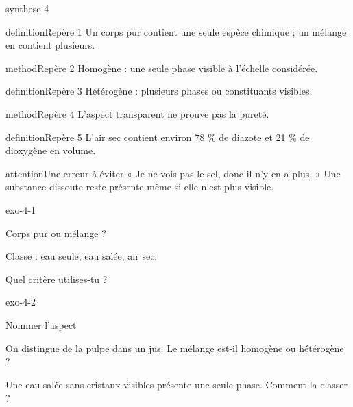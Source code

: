 \documentclass[12pt,twoside,openany]{book}
\begin{document}
\label{ch-4-bilan}
\begin{pcFiche}{synthese-4}
\begin{pcEncadre}{definition}{Repère 1}
Un corps pur contient une seule espèce chimique ; un mélange en contient plusieurs.\par
\end{pcEncadre}
\begin{pcEncadre}{method}{Repère 2}
Homogène : une seule phase visible à l’échelle considérée.\par
\end{pcEncadre}
\begin{pcEncadre}{definition}{Repère 3}
Hétérogène : plusieurs phases ou constituants visibles.\par
\end{pcEncadre}
\begin{pcEncadre}{method}{Repère 4}
L’aspect transparent ne prouve pas la pureté.\par
\end{pcEncadre}
\begin{pcEncadre}{definition}{Repère 5}
L’air sec contient environ 78 \% de diazote et 21 \% de dioxygène en volume.\par
\end{pcEncadre}
\begin{pcEncadre}{attention}{Une erreur à éviter}
« Je ne vois pas le sel, donc il n’y en a plus. » Une substance dissoute reste présente même si elle n’est plus visible.\par
\end{pcEncadre}
\end{pcFiche}
\clearpage{}
\begin{blocLivre}{exo-4-1}
\begin{exercice}[1]{Corps pur ou mélange ?}
\begin{questions}
\item Classe : eau seule, eau salée, air sec.
\item Quel critère utilises-tu ?
\end{questions}
\end{exercice}\end{blocLivre}
\begin{blocLivre}{exo-4-2}
\begin{exercice}[1]{Nommer l’aspect}
\begin{questions}
\item On distingue de la pulpe dans un jus. Le mélange est-il homogène ou hétérogène ?
\item Une eau salée sans cristaux visibles présente une seule phase. Comment la classer ?
\end{questions}
\end{exercice}\end{blocLivre}
\end{document}
